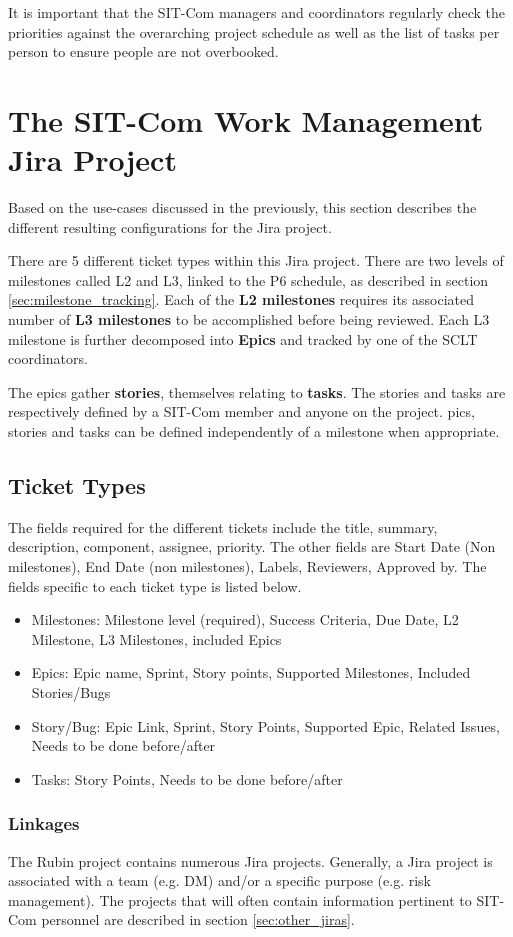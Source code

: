 \documentclass[SE,authoryear,toc]{lsstdoc}
\begin{document}
It is important that the SIT-Com managers and coordinators regularly check the priorities against the overarching project schedule as well as the list of tasks per person to ensure people are not overbooked. 


\section{The SIT-Com Work Management Jira Project}
\label{sec:jira}
Based on the use-cases discussed in the previously, this section describes the different resulting configurations for the Jira project. 

There are 5 different ticket types within this Jira project.
There are two levels of milestones called L2 and L3, linked to the P6 schedule, as described in section \ref{sec:milestone_tracking}.
Each of the {\bf L2 milestones} requires its associated number of {\bf L3 milestones} to be accomplished before being reviewed. 
Each L3 milestone is further decomposed into {\bf Epics} and tracked by one of the SCLT coordinators. 

The epics gather {\bf stories}, themselves relating to {\bf tasks}. 
The stories and tasks are respectively defined by a SIT-Com member and anyone on the project. 
pics, stories and tasks can be defined independently of a milestone when appropriate.

\subsection{Ticket Types}
The fields required for the different tickets include the title, summary, description, component, assignee, priority. 
The other fields are Start Date (Non milestones), End Date (non milestones), Labels, Reviewers, Approved by.  
The fields specific to each ticket type is listed below.
\begin{itemize}
\item{Milestones}: Milestone level (required), Success Criteria, Due Date, L2 Milestone, L3 Milestones, included Epics
\item{Epics}: Epic name, Sprint, Story points, Supported Milestones, Included Stories/Bugs
\item{Story/Bug}: Epic Link, Sprint, Story Points, Supported Epic, Related Issues, Needs to be done before/after
\item{Tasks}: Story Points, Needs to be done before/after
\end{itemize}

\subsubsection{Linkages}
The Rubin project contains numerous Jira projects.
Generally, a Jira project is associated with a team (e.g. DM) and/or a specific purpose (e.g. risk management).
The projects that will often contain information pertinent to SIT-Com personnel are described in section \ref{sec:other_jiras}.
\end{document}
